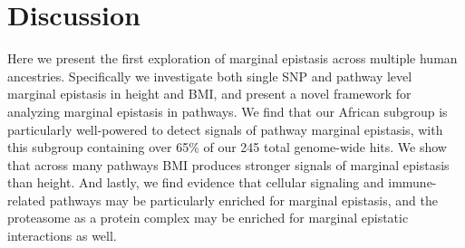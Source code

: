 \documentclass[12pt,a4paper]{article}
\begin{document}








\section{Discussion}\label{InterPath-Discussion}

Here we present the first exploration of marginal epistasis across multiple human ancestries. Specifically we investigate both single SNP and pathway level marginal epistasis in height and BMI, and present a novel framework for analyzing marginal epistasis in pathways. We find that our African subgroup is particularly well-powered to detect signals of pathway marginal epistasis, with this subgroup containing over 65\% of our 245 total genome-wide hits. We show that across many pathways BMI produces stronger signals of marginal epistasis than height. And lastly, we find evidence that cellular signaling and immune-related pathways may be particularly enriched for marginal epistasis, and the proteasome as a protein complex may be enriched for marginal epistatic interactions as well. 
\end{document}
